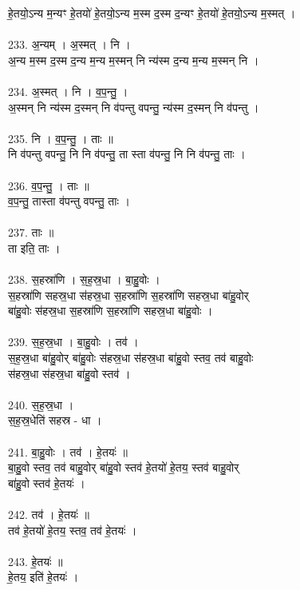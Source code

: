 हे॒तयो॒ऽन्य म॒न्यꣳ हे॒तयो॑ हे॒तयो॒ऽन्य म॒स्म द॒स्म द॒न्यꣳ हे॒तयो॑ हे॒तयो॒ऽन्य म॒स्मत् ।\\
\\
233. अ॒न्यम् । अ॒स्मत् । नि ।\\
अ॒न्य म॒स्म द॒स्म द॒न्य म॒न्य म॒स्मन् नि न्य॑स्म द॒न्य म॒न्य म॒स्मन् नि ।\\
\\
234. अ॒स्मत् । नि । व॒प॒न्तु॒ ।\\
अ॒स्मन् नि न्य॑स्म द॒स्मन् नि व॑पन्तु वपन्तु॒ न्य॑स्म द॒स्मन् नि व॑पन्तु ।\\
\\
235. नि । व॒प॒न्तु॒ । ताः ॥\\
नि व॑पन्तु वपन्तु॒ नि नि व॑पन्तु॒ ता स्ता व॑पन्तु॒ नि नि व॑पन्तु॒ ताः ।\\
\\
236. व॒प॒न्तु॒ । ताः ॥\\
व॒प॒न्तु॒ तास्ता व॑पन्तु वपन्तु॒ ताः ।\\
\\
237. ताः ॥\\
ता इति॒ ताः ।\\
\\
238. स॒हस्रा॑णि । स॒ह॒स्र॒धा । बा॒हु॒वोः ।\\
स॒हस्रा॑णि सहस्र॒धा स॑हस्र॒धा स॒हस्रा॑णि स॒हस्रा॑णि सहस्र॒धा बा॑हु॒वोर्\\
बा॑हु॒वोः स॑हस्र॒धा स॒हस्रा॑णि स॒हस्रा॑णि सहस्र॒धा बा॑हु॒वोः ।\\
\\
239. स॒ह॒स्र॒धा । बा॒हु॒वोः । तव॑ ।\\
स॒ह॒स्र॒धा बा॑हु॒वोर् बा॑हु॒वोः स॑हस्र॒धा स॑हस्र॒धा बा॑हु॒वो स्तव॒ तव॑ बाहु॒वोः\\
स॑हस्र॒धा स॑हस्र॒धा बा॑हु॒वो स्तव॑ ।\\
\\
240. स॒ह॒स्र॒धा ।\\
स॒ह॒स्र॒धेति॑ सहस्र - धा ।\\
\\
241. बा॒हु॒वोः । तव॑ । हे॒तयः॑ ॥\\
बा॒हु॒वो स्तव॒ तव॑ बाहु॒वोर् बा॑हु॒वो स्तव॑ हे॒तयो॑ हे॒तय॒ स्तव॑ बाहु॒वोर्\\
बा॑हु॒वो स्तव॑ हे॒तयः॑ ।\\
\\
242. तव॑ । हे॒तयः॑ ॥\\
तव॑ हे॒तयो॑ हे॒तय॒ स्तव॒ तव॑ हे॒तयः॑ ।\\
\\
243. हे॒तयः॑ ॥\\
हे॒तय॒ इति॑ हे॒तयः॑ ।\\
